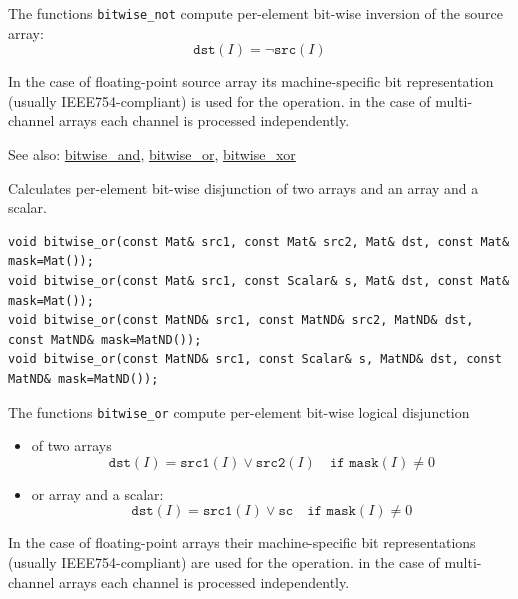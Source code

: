 The functions \texttt{bitwise\_not} compute per-element bit-wise inversion of the source array:
\[\texttt{dst}(I) = \neg\texttt{src}(I)\]

In the case of floating-point source array its machine-specific bit representation (usually IEEE754-compliant) is used for the operation. in the case of multi-channel arrays each channel is processed independently.

See also: \hyperref[bitwise.and]{bitwise\_and}, \hyperref[bitwise.or]{bitwise\_or}, \hyperref[bitwise.xor]{bitwise\_xor}


Calculates per-element bit-wise disjunction of two arrays and an array and a scalar.

\begin{lstlisting}
void bitwise_or(const Mat& src1, const Mat& src2, Mat& dst, const Mat& mask=Mat());
void bitwise_or(const Mat& src1, const Scalar& s, Mat& dst, const Mat& mask=Mat());
void bitwise_or(const MatND& src1, const MatND& src2, MatND& dst, const MatND& mask=MatND());
void bitwise_or(const MatND& src1, const Scalar& s, MatND& dst, const MatND& mask=MatND());
\end{lstlisting}
\begin{description}
\end{description}

The functions \texttt{bitwise\_or} compute per-element bit-wise logical disjunction
\begin{itemize}
    \item of two arrays
    \[\texttt{dst}(I) = \texttt{src1}(I) \vee \texttt{src2}(I)\quad\texttt{if mask}(I)\ne0\]
    \item or array and a scalar:
    \[\texttt{dst}(I) = \texttt{src1}(I) \vee \texttt{sc}\quad\texttt{if mask}(I)\ne0\]
\end{itemize}

In the case of floating-point arrays their machine-specific bit representations (usually IEEE754-compliant) are used for the operation. in the case of multi-channel arrays each channel is processed independently.

